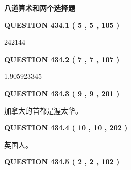 \documentclass{ctexart}
\begin{document}
   
   
   
 \vspace{0.2in}
{\LARGE {\textbf{ 八道算术和两个选择题}}}
   
   
  
\vspace{0.2in}
  
{\textbf{\Large{QUESTION
434.1 
 ( 5 , 5 , 105 )
}}}
  
  
 
 
\noindent{}

242144
 
 
  
\vspace{0.2in}
  
{\textbf{\Large{QUESTION
434.2 
 ( 7 , 7 , 107 )
}}}
  
  
 
 
\noindent{}

1.905923345
 
 
  
\vspace{0.2in}
  
{\textbf{\Large{QUESTION
434.3 
 ( 9 , 9 , 201 )
}}}
  
  
 
 
\noindent{}
 
 
加拿大的首都是渥太华。
 
 
 
 
  
\vspace{0.2in}
  
{\textbf{\Large{QUESTION
434.4 
 ( 10 , 10 , 202 )
}}}
  
  
 
 
\noindent{}
 
 
英国人。
 
 
 
 
  
\vspace{0.2in}
  
{\textbf{\Large{QUESTION
434.5 
 ( 2 , 2 , 102 )
}}}
  
  
 
 
\noindent{}
\end{document}
